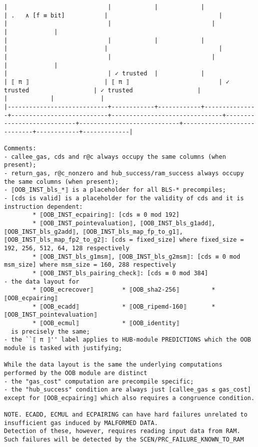 \documentclass[varwidth=\maxdimen,margin=0.5cm,multi={verbatim}]{standalone}
\begin{document}
\begin{verbatim}
|                            |            |            |               | .   ∧ [f ≡ bit]           |                               |                            |                            |                            |            |             |
|                            |            |            |               |                           |                               |                            |                            |                            |            |             |
|                            | ✓ trusted  |            |               | ⟦ π ⟧                     | ⟦ π ⟧                         | ✓ trusted                  | ✓ trusted                  |                            |            |             |
|----------------------------+------------+------------+---------------+---------------------------+-------------------------------+----------------------------+----------------------------+----------------------------+------------+-------------|

Comments: 
- callee_gas, cds and r@c always occupy the same columns (when present);
- return_gas, r@c_nonzero and hub_success/ram_success always occupy the same columns (when present);
- ⟦OOB_INST_bls_*⟧ is a placeholder for all BLS-* precompiles;
- [cds is valid] is a placeholder for the validity of cds and it is instruction dependent:
        * ⟦OOB_INST_ecpairing⟧: [cds ≡ 0 mod 192]
        * ⟦OOB_INST_pointevaluation⟧, ⟦OOB_INST_bls_g1add⟧, ⟦OOB_INST_bls_g2add⟧, ⟦OOB_INST_bls_map_fp_to_g1⟧, ⟦OOB_INST_bls_map_fp2_to_g2⟧: [cds = fixed_size] where fixed_size = 192, 256, 512, 64, 128 respectively  
        * ⟦OOB_INST_bls_g1msm⟧, ⟦OOB_INST_bls_g2msm⟧: [cds ≡ 0 mod msm_size] where msm_size = 160, 288 respectively
        * ⟦OOB_INST_bls_pairing_check⟧: [cds ≡ 0 mod 384]
- the data layout for
        * ⟦OOB_ecrecover⟧        * ⟦OOB_sha2-256⟧         * ⟦OOB_ecpairing⟧
        * ⟦OOB_ecadd⟧            * ⟦OOB_ripemd-160⟧       * ⟦OOB_INST_pointevaluation⟧           
        * ⟦OOB_ecmul⟧            * ⟦OOB_identity⟧
  is precisely the same;
- the ``⟦ π ⟧'' label applies to HUB-module PREDICTIONS which the OOB module is tasked with justifying;

While the data layout is the same the underlying computations performed by the OOB module are distinct
- the "gas_cost" computation are precompile specific;
- the "hub_success" condition are always just [callee_gas ≤ gas_cost] except for ⟦OOB_ecpairing⟧ which also requires a congruence condition.

NOTE. ECADD, ECMUL and ECPAIRING can have hard failures unrelated to insufficient gas induced by MALFORMED DATA.
Detection of these, however, requires reading input data from RAM. Such failures will be detected by the SCEN/PRC_FAILURE_KNOWN_TO_RAM 
\end{verbatim}
\end{document}
